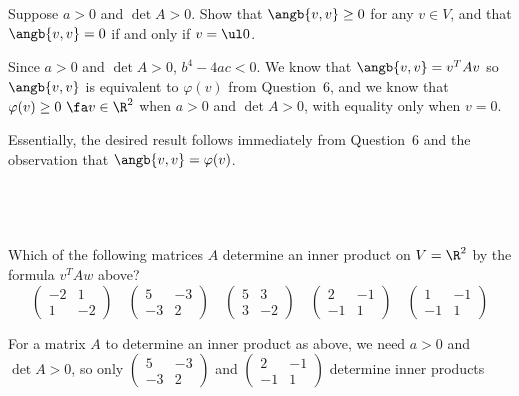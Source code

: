 \documentclass[a4paper]{article}
\begin{document}
\begin{questionbody}
Suppose $a > 0$ and $\det A > 0$. Show that $\angb{v, v} \ge 0$ for any $v \in V$, and that $\angb{v, v} = 0$ if and only if $v = \ul 0$.
\end{questionbody}

Since $a > 0$ and $\det A > 0$, $b^4 - 4ac < 0$. We know that $\angb{v, v} = v^T A v$ so $\angb{v, v}$ is equivalent to $\varphi(v)$ from Question~6, and we know that $\varphi(v) \ge 0\ \fa v \in \R^2$ when $a > 0$ and $\det A > 0$, with equality only when $v=0$.

Essentially, the desired result follows immediately from Question~6 and the observation that $\angb{v, v} = \varphi(v)$.

\subsection{~} %

\begin{questionbody}
Which of the following matrices $A$ determine an inner product on $V = \R^2$ by the formula $v^T A w$ above?
\[
\begin{pmatrix}-2 & 1 \\ 1 & -2\end{pmatrix}\hspace{1em}
\begin{pmatrix}5 & -3 \\ -3 & 2\end{pmatrix}\hspace{1em}
\begin{pmatrix}5 & 3 \\ 3 & -2\end{pmatrix}\hspace{1em}
\begin{pmatrix}2 & -1 \\ -1 & 1\end{pmatrix}\hspace{1em}
\begin{pmatrix}1 & -1 \\ -1 & 1\end{pmatrix}
\]
\end{questionbody}

For a matrix $A$ to determine an inner product as above, we need $a > 0$ and $\det A > 0$, so only $\begin{pmatrix}5 & -3 \\ -3 & 2\end{pmatrix}$ and $\begin{pmatrix}2 & -1 \\ -1 & 1\end{pmatrix}$ determine inner products

\end{document}
